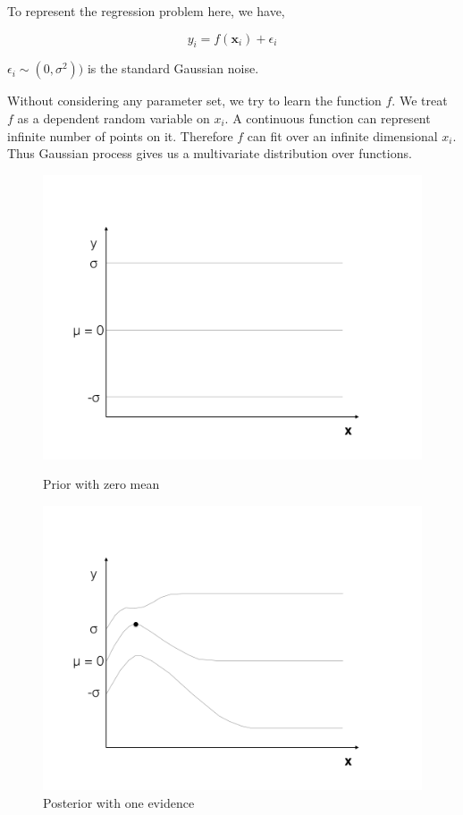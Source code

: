 \documentclass[english]{tktltiki}
\begin{document}
To represent the regression problem here, we have,

\begin{equation}
y_i = f(\mathbf{x}_i) + \epsilon_i
\end{equation}

$\epsilon_i \sim (0, \sigma^2))$ is the standard Gaussian noise.

Without considering any parameter set, we try to learn the function $f$. We treat $f$ as a dependent random variable on $x_i$. A continuous function can represent infinite number of points on it. Therefore $f$ can fit over an infinite dimensional $x_i$. Thus Gaussian process gives us a multivariate distribution over functions.

\begin{figure}
\centering
\begin{minipage}{.5\linewidth}
  \centering
  \includegraphics[width=\linewidth]{figures/GP_1.png}
  \caption{Prior with zero mean}
  \label{fig:sub1}
\end{minipage}%
\begin{minipage}{.5\linewidth}
  \centering
  \includegraphics[width=\linewidth]{figures/GP_2.png}
  \caption{Posterior with one evidence}
  \label{fig:sub2}
\end{minipage}


\end{figure}
\end{document}
